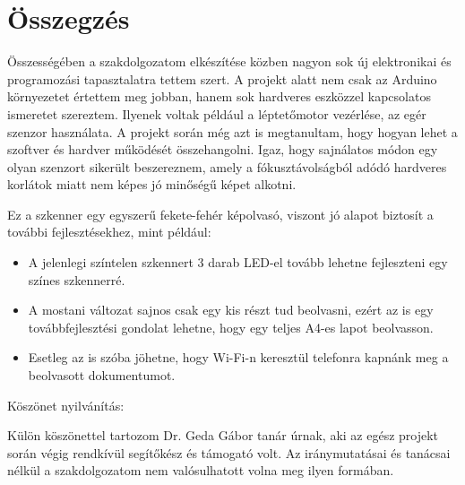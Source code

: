 \documentclass[]{thesis-ekf}
\theoremstyle{definition}
\theoremstyle{remark}
\begin{document}
	\chapter*{Összegzés}
	Összességében a szakdolgozatom elkészítése közben nagyon sok új elektronikai és programozási tapasztalatra tettem szert. A projekt alatt nem csak az Arduino környezetet értettem meg jobban, hanem sok hardveres eszközzel kapcsolatos ismeretet szereztem. Ilyenek voltak például a léptetőmotor vezérlése, az egér szenzor használata. A projekt során még azt is megtanultam, hogy hogyan lehet a szoftver és hardver működését összehangolni. Igaz, hogy sajnálatos módon egy olyan szenzort sikerült beszereznem, amely a fókusztávolságból adódó hardveres korlátok miatt nem képes jó minőségű képet alkotni.
	
	Ez a szkenner egy egyszerű fekete-fehér képolvasó, viszont jó alapot biztosít a további fejlesztésekhez, mint például:
	\begin{itemize}
		\item A jelenlegi színtelen szkennert 3 darab LED-el tovább lehetne fejleszteni egy színes szkennerré.
		\item A mostani változat sajnos csak egy kis részt tud beolvasni, ezért az is egy továbbfejlesztési gondolat lehetne, hogy egy teljes A4-es lapot beolvasson.
		\item Esetleg az is szóba jöhetne, hogy Wi-Fi-n keresztül telefonra kapnánk meg a beolvasott dokumentumot.
	\end{itemize}
	\vspace*{2cm}
	Köszönet nyilvánítás: 
	
	Külön köszönettel tartozom Dr. Geda Gábor tanár úrnak, aki az egész projekt során végig rendkívül segítőkész és támogató volt. Az iránymutatásai és tanácsai nélkül a szakdolgozatom nem valósulhatott volna meg ilyen formában.
\end{document}
